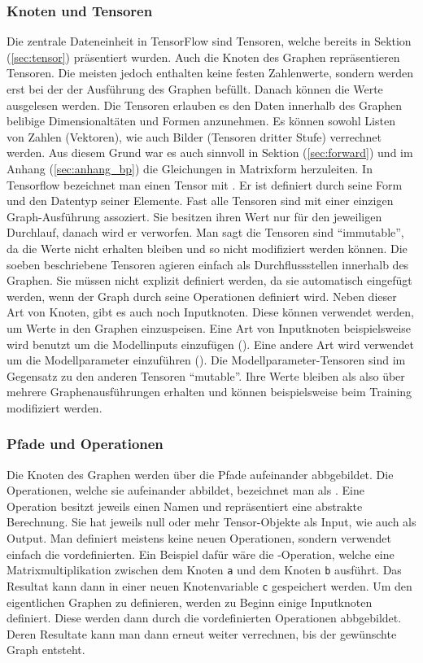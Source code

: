 \subsubsection{Knoten und Tensoren}
Die zentrale Dateneinheit in TensorFlow sind Tensoren, welche bereits in Sektion
(\ref{sec:tensor}) präsentiert wurden. Auch die Knoten des Graphen
repräsentieren Tensoren. Die meisten jedoch enthalten keine festen Zahlenwerte,
sondern werden erst bei der der Ausführung des Graphen befüllt. Danach können
die Werte ausgelesen werden. \para{} Die Tensoren erlauben es den Daten
innerhalb des Graphen belibige Dimensionaltäten und Formen anzunehmen. Es können
sowohl Listen von Zahlen (Vektoren), wie auch Bilder (Tensoren dritter Stufe)
verrechnet werden. Aus diesem Grund war es auch sinnvoll in Sektion
(\ref{sec:forward}) und im Anhang (\ref{sec:anhang_bp}) die Gleichungen in
Matrixform herzuleiten. \para{} In Tensorflow bezeichnet man einen Tensor mit
. Er ist definiert durch seine Form und den Datentyp seiner
Elemente. \para{} Fast alle Tensoren sind mit einer einzigen Graph-Ausführung
assoziert. Sie besitzen ihren Wert nur für den jeweiligen Durchlauf, danach wird
er verworfen. Man sagt die Tensoren sind ``immutable'', da die Werte nicht
erhalten bleiben und so nicht modifiziert werden können. \para{} Die soeben
beschriebene Tensoren agieren einfach als Durchflussstellen innerhalb des
Graphen. Sie müssen nicht explizit definiert werden, da sie automatisch
eingefügt werden, wenn der Graph durch seine Operationen definiert wird. \para{}
Neben dieser Art von Knoten, gibt es auch noch Inputknoten. Diese können
verwendet werden, um Werte in den Graphen einzuspeisen. Eine Art von Inputknoten
beispielsweise wird benutzt um die Modellinputs einzufügen
(). Eine andere Art wird verwendet um die Modellparameter
einzuführen (). Die Modellparameter-Tensoren sind im Gegensatz
zu den anderen Tensoren ``mutable''. Ihre Werte bleiben als also über mehrere
Graphenausführungen erhalten und können beispielsweise beim Training modifiziert werden.

\subsubsection{Pfade und Operationen}
Die Knoten des Graphen werden über die Pfade aufeinander
abbgebildet. Die Operationen, welche sie aufeinander abbildet, bezeichnet man
als . Eine Operation besitzt jeweils einen Namen und repräsentiert eine
abstrakte Berechnung. Sie hat jeweils null oder mehr Tensor-Objekte als
Input, wie auch als Output.
\para{}
Man definiert meistens keine neuen Operationen, sondern verwendet einfach die vordefinierten.
Ein Beispiel dafür wäre die -Operation, welche eine
Matrixmultiplikation zwischen dem Knoten \texttt{a} und dem Knoten \texttt{b}
ausführt. Das Resultat kann dann in einer neuen Knotenvariable
\texttt{c} gespeichert werden.
\para{}
Um den eigentlichen Graphen zu definieren, werden zu Beginn einige Inputknoten
definiert. Diese werden dann durch die vordefinierten Operationen abbgebildet.
Deren Resultate kann man dann erneut weiter verrechnen, bis der gewünschte Graph entsteht.


